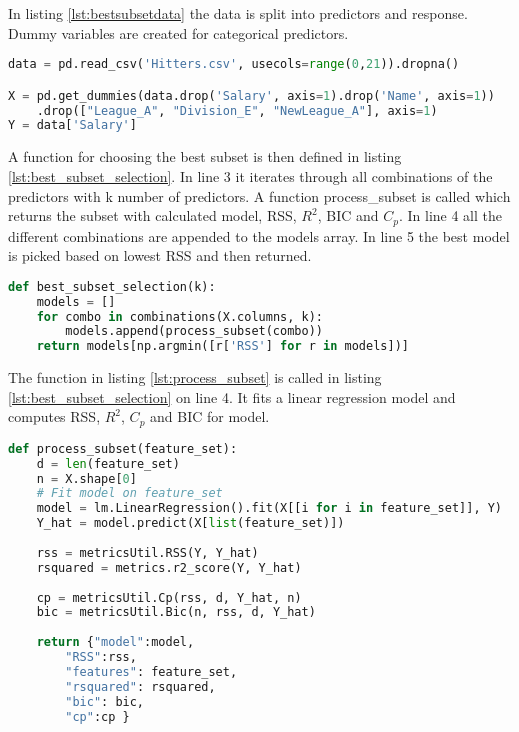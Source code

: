In listing \ref{lst:bestsubsetdata} the data is split into predictors and response. Dummy variables are created for categorical predictors.

\begin{lstlisting}[language=Python, label=lst:bestsubsetdata, caption=Data is split into predictors and response]
data = pd.read_csv('Hitters.csv', usecols=range(0,21)).dropna()

X = pd.get_dummies(data.drop('Salary', axis=1).drop('Name', axis=1))
	.drop(["League_A", "Division_E", "NewLeague_A"], axis=1)
Y = data['Salary']
\end{lstlisting}


A function for choosing the best subset is then defined in listing \ref{lst:best_subset_selection}. In line 3 it iterates through all combinations of the predictors with k number of predictors. A function process\_subset is called which returns the subset with calculated model, RSS, $R^2$, BIC and $C_p$. In line 4 all the different combinations are appended to the models array. In line 5 the best model is picked based on lowest RSS and then returned.

\begin{lstlisting}[language=Python, label=lst:best_subset_selection, caption=Function for choosing best subset]
def best_subset_selection(k):
	models = []
	for combo in combinations(X.columns, k):
		models.append(process_subset(combo))
	return models[np.argmin([r['RSS'] for r in models])]
\end{lstlisting}

The function in listing \ref{lst:process_subset} is called in listing \ref{lst:best_subset_selection} on line 4. It fits a linear regression model and computes RSS, $R^2$, $C_p$ and BIC for model.

\begin{lstlisting}[language=Python, label=lst:process_subset, caption=Function for computing metrics for subset]
def process_subset(feature_set):
	d = len(feature_set)
	n = X.shape[0]
	# Fit model on feature_set  
	model = lm.LinearRegression().fit(X[[i for i in feature_set]], Y)
	Y_hat = model.predict(X[list(feature_set)])
	
	rss = metricsUtil.RSS(Y, Y_hat)  
	rsquared = metrics.r2_score(Y, Y_hat)
	
	cp = metricsUtil.Cp(rss, d, Y_hat, n)
	bic = metricsUtil.Bic(n, rss, d, Y_hat)
	
	return {"model":model, 
		"RSS":rss,
		"features": feature_set,
		"rsquared": rsquared,
		"bic": bic,
		"cp":cp }
\end{lstlisting}

